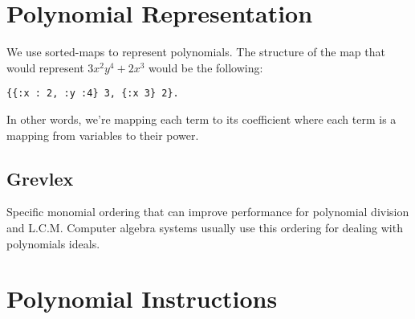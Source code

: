 \documentclass[20pt]{extarticle}
\begin{document}
\newpage
\section*{Polynomial Representation}

We use sorted-maps to represent polynomials. The structure of the map that would represent $3x^2y^4 + 2x^3$ would be the following:

\begin{verbatim}
{{:x : 2, :y :4} 3, {:x 3} 2}.
\end{verbatim}

In other words, we're mapping each term to its coefficient where each term is a mapping from variables to their power.

\subsection*{Grevlex}

Specific monomial ordering that can improve performance for polynomial division and L.C.M.
Computer algebra systems usually use this ordering for dealing with polynomials ideals.


\newpage
\section*{Polynomial Instructions}
\end{document}
